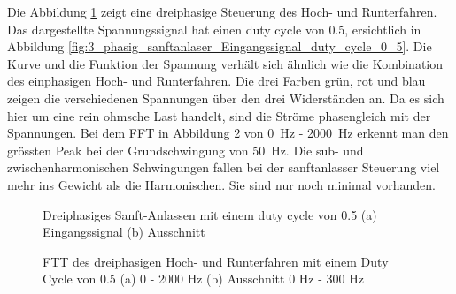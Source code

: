 Die Abbildung \ref{fig:drei_phasiges_Sanft_anlassen} zeigt eine dreiphasige  Steuerung des Hoch- und Runterfahren. Das dargestellte Spannungssignal hat einen duty cycle von 0.5, ersichtlich in Abbildung \ref{fig:3_phasig_sanftanlaser_Eingangssignal_duty_cycle_0_5}. Die Kurve und die Funktion der Spannung verhält sich ähnlich wie die Kombination des einphasigen Hoch- und Runterfahren. Die drei Farben grün, rot und blau zeigen die verschiedenen Spannungen über den drei Widerständen an. Da es sich hier um eine rein ohmsche Last handelt, sind die Ströme phasengleich  mit der Spannungen. Bei dem FFT in Abbildung \ref{fig:dreiphasiges_Sanft_anlassen_FTT} von \SI{0}{Hz} - \SI{2000}{Hz} erkennt man den grössten Peak bei der Grundschwingung von \SI{50}{Hz}. Die sub- und zwischenharmonischen Schwingungen fallen bei der sanftanlasser Steuerung viel mehr ins Gewicht als die Harmonischen. Sie sind nur noch minimal vorhanden.   


\begin{figure}[ht!]
	\centering
	\qquad
	\caption{Dreiphasiges Sanft-Anlassen mit einem duty cycle von 0.5 (a) Eingangssignal (b) Ausschnitt}
	\label{fig:drei_phasiges_Sanft_anlassen}
\end{figure}

\begin{figure}[ht!]
	\centering
	\qquad
	\caption{FTT des dreiphasigen Hoch- und Runterfahren mit einem Duty Cycle von 0.5 (a) 0 - 2000 Hz (b) Ausschnitt 0 Hz - 300 Hz}
	\label{fig:dreiphasiges_Sanft_anlassen_FTT}
\end{figure}

\newpage

